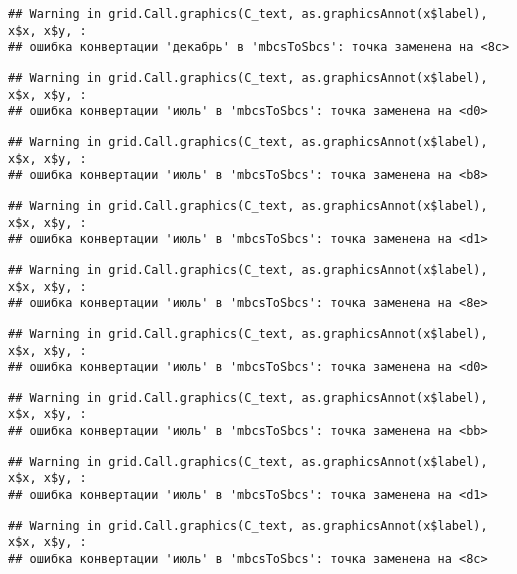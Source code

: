 \documentclass[
]{article}
\begin{document}
\begin{verbatim}
## Warning in grid.Call.graphics(C_text, as.graphicsAnnot(x$label), x$x, x$y, :
## ошибка конвертации 'декабрь' в 'mbcsToSbcs': точка заменена на <8c>
\end{verbatim}

\begin{verbatim}
## Warning in grid.Call.graphics(C_text, as.graphicsAnnot(x$label), x$x, x$y, :
## ошибка конвертации 'июль' в 'mbcsToSbcs': точка заменена на <d0>
\end{verbatim}

\begin{verbatim}
## Warning in grid.Call.graphics(C_text, as.graphicsAnnot(x$label), x$x, x$y, :
## ошибка конвертации 'июль' в 'mbcsToSbcs': точка заменена на <b8>
\end{verbatim}

\begin{verbatim}
## Warning in grid.Call.graphics(C_text, as.graphicsAnnot(x$label), x$x, x$y, :
## ошибка конвертации 'июль' в 'mbcsToSbcs': точка заменена на <d1>
\end{verbatim}

\begin{verbatim}
## Warning in grid.Call.graphics(C_text, as.graphicsAnnot(x$label), x$x, x$y, :
## ошибка конвертации 'июль' в 'mbcsToSbcs': точка заменена на <8e>
\end{verbatim}

\begin{verbatim}
## Warning in grid.Call.graphics(C_text, as.graphicsAnnot(x$label), x$x, x$y, :
## ошибка конвертации 'июль' в 'mbcsToSbcs': точка заменена на <d0>
\end{verbatim}

\begin{verbatim}
## Warning in grid.Call.graphics(C_text, as.graphicsAnnot(x$label), x$x, x$y, :
## ошибка конвертации 'июль' в 'mbcsToSbcs': точка заменена на <bb>
\end{verbatim}

\begin{verbatim}
## Warning in grid.Call.graphics(C_text, as.graphicsAnnot(x$label), x$x, x$y, :
## ошибка конвертации 'июль' в 'mbcsToSbcs': точка заменена на <d1>
\end{verbatim}

\begin{verbatim}
## Warning in grid.Call.graphics(C_text, as.graphicsAnnot(x$label), x$x, x$y, :
## ошибка конвертации 'июль' в 'mbcsToSbcs': точка заменена на <8c>
\end{verbatim}
\end{document}
